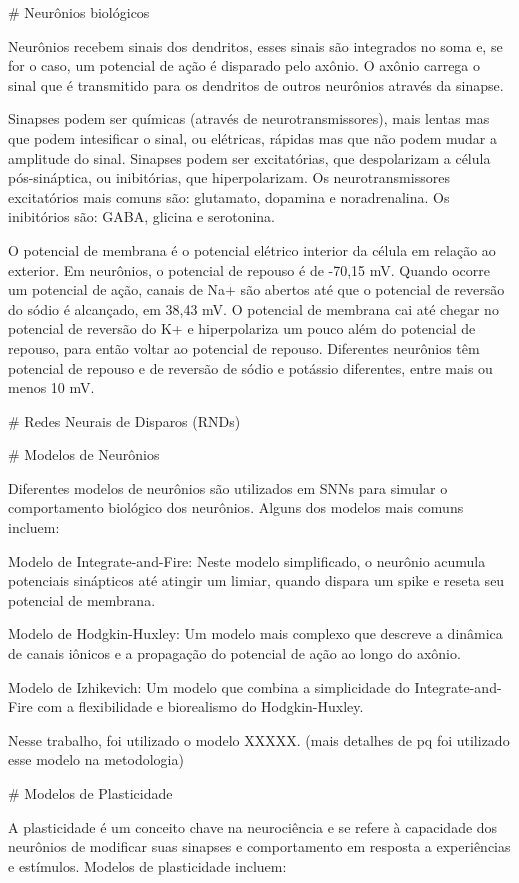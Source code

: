 # Neurônios biológicos

Neurônios recebem sinais dos dendritos, esses sinais são integrados no soma e, se for o caso, um potencial de ação é disparado
pelo axônio. O axônio carrega o sinal que é transmitido para os dendritos de outros neurônios através da sinapse.

Sinapses podem ser químicas (através de neurotransmissores), mais lentas mas que podem intesificar o sinal, ou elétricas, rápidas
mas que não podem mudar a amplitude do sinal. Sinapses podem ser excitatórias, que despolarizam a célula pós-sináptica, ou
inibitórias, que hiperpolarizam. Os neurotransmissores excitatórios mais comuns são: glutamato, dopamina e noradrenalina. Os
inibitórios são: GABA, glicina e serotonina.

O potencial de membrana é o potencial elétrico interior da célula em relação ao exterior. Em neurônios, o potencial de repouso é
de -70,15 mV. Quando ocorre um potencial de ação, canais de Na+ são abertos até que o potencial de reversão do sódio é alcançado,
em 38,43 mV. O potencial de membrana cai até chegar no potencial de reversão do K+ e hiperpolariza um pouco além do potencial de
repouso, para então voltar ao potencial de repouso. Diferentes neurônios têm potencial de repouso e de reversão de sódio e
potássio diferentes, entre mais ou menos 10 mV.

# Redes Neurais de Disparos (RNDs)


# Modelos de Neurônios

Diferentes modelos de neurônios são utilizados em SNNs para simular o comportamento biológico dos neurônios. Alguns dos modelos
mais comuns incluem:

Modelo de Integrate-and-Fire: Neste modelo simplificado, o neurônio acumula potenciais sinápticos até atingir um limiar, quando
dispara um spike e reseta seu potencial de membrana.

Modelo de Hodgkin-Huxley: Um modelo mais complexo que descreve a dinâmica de
canais iônicos e a propagação do potencial de ação ao longo do axônio.

Modelo de Izhikevich: Um modelo que combina a simplicidade
do Integrate-and-Fire com a flexibilidade e biorealismo do Hodgkin-Huxley.

Nesse trabalho, foi utilizado o modelo XXXXX. (mais detalhes de pq foi utilizado esse modelo na metodologia)

# Modelos de Plasticidade

A plasticidade é um conceito chave na neurociência e se refere à capacidade dos neurônios de modificar suas sinapses e
comportamento em resposta a experiências e estímulos. Modelos de plasticidade incluem:

